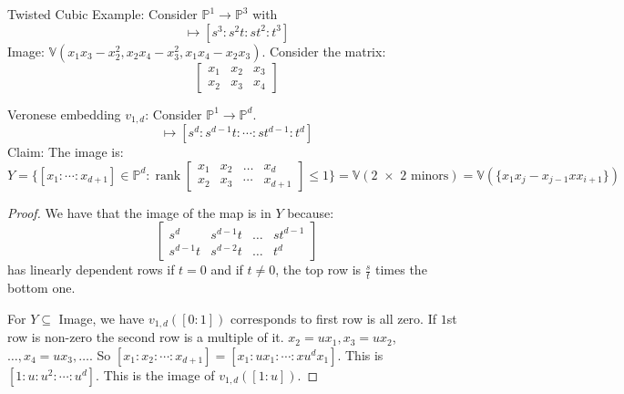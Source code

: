 \documentclass{report}
\begin{document}
Twisted Cubic Example: Consider $\mathbb{P}^{1} \rightarrow \mathbb{P}^{3}$ with
    \begin{equation*}
        [s : t] \mapsto [s^{3} : s^{2}t : st^{2} : t^{3}]
    \end{equation*}
Image: $\mathbb{V}(x_{1}x_{3} - x^{2}_{2}, x_{2}x_{4} - x_{3}^{2}, x_{1}x_{4} - x_{2}x_{3})$. Consider the matrix:
    \begin{equation*}
        \begin{bmatrix}
            x_{1} & x_{2} & x_{3} \\
            x_{2} & x_{3} & x_{4}   
        \end{bmatrix}
    \end{equation*}

Veronese embedding $v_{1, d}$: Consider $\mathbb{P}^{1} \rightarrow \mathbb{P}^{d}$. 
    \begin{equation*}
        [s : t] \mapsto [s^{d} : s^{d - 1}t : \cdots : st^{d - 1} : t^{d}]
    \end{equation*}
Claim: The image is:
    \begin{equation*}
        Y = \{[x_{1} : \cdots : x_{d + 1}]  \in \mathbb{P}^{d} : \mathop{rank}\begin{bmatrix}
            x_{1} & x_{2} & \ldots &  x_{d}     \\
            x_{2} & x_{3} & \cdots &  x_{d + 1}   
        \end{bmatrix} \leq 1\} = \mathbb{V}(\text{2 $\times$ 2 minors}) = \mathbb{V}(\{x_{1}x_{j} - x_{j - 1}xx_{i + 1}\})
    \end{equation*}

\begin{proof}
    We have that the image of the map is in $Y$ because:
        \begin{equation*}
            \begin{bmatrix}
                s^{d}      & s^{d - 1}t & \ldots &  st^{d - 1} \\
                s^{d - 1}t & s^{d - 2}t & \ldots &  t^{d}        
            \end{bmatrix}
        \end{equation*}
    has linearly dependent rows if $t = 0$ and if $t \neq 0$, the top row is $\frac{s}{t}$ times the bottom one.

    For $Y \subseteq $ Image, we have $v_{1, d}([0 : 1]) $ corresponds to first row is all zero. If $1$st row is non-zero the second row is a multiple of it. $x_{2} = ux_{1}, x_{3} = ux_{2}$, $\ldots, x_{4} = ux_{3}, \ldots$. So $[x_{1} : x_{2} : \cdots : x_{d + 1}] = [x_{1}  : ux_{1} : \cdots : xu^{d}x_{1}]$. This is $[1 : u : u^{2} : \cdots : u^{d}]$. This is the image of $v_{1, d}([1 : u])$.
\end{proof}
\end{document}
